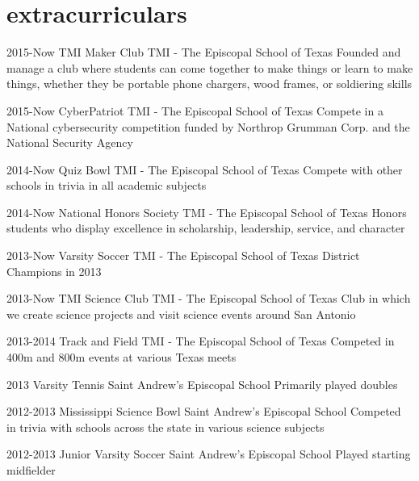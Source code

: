 \documentclass[]{friggeri-cv} %
\begin{document}
\section{extracurriculars}

\begin{entrylist}


\entry
{2015-Now}
{TMI Maker Club}
{TMI - The Episcopal School of Texas}
{Founded and manage a club where students can come together to make things or learn to make things, whether they be portable phone chargers, wood frames, or soldiering skills}



\entry
{2015-Now}
{CyberPatriot}
{TMI - The Episcopal School of Texas}
{Compete in a National cybersecurity competition funded by Northrop Grumman Corp. and the National Security Agency}


\entry
{2014-Now}
{Quiz Bowl}
{TMI - The Episcopal School of Texas}
{Compete with other schools in trivia in all academic subjects}


\entry
{2014-Now}
{National Honors Society}
{TMI - The Episcopal School of Texas}
{Honors students who display excellence in scholarship, leadership, service, and character}


\entry
{2013-Now}
{Varsity Soccer}
{TMI - The Episcopal School of Texas}
{District Champions in 2013}


\entry
{2013-Now}
{TMI Science Club}
{TMI - The Episcopal School of Texas}
{Club in which we create science projects and visit science events around San Antonio}


\entry
{2013-2014}
{Track and Field}
{TMI - The Episcopal School of Texas}
{Competed in 400m and 800m events at various Texas meets}


\entry
{2013}
{Varsity Tennis}
{Saint Andrew's Episcopal School}
{Primarily played doubles}


\entry
{2012-2013}
{Mississippi Science Bowl}
{Saint Andrew's Episcopal School}
{Competed in trivia with schools across the state in various science subjects}


\entry
{2012-2013}
{Junior Varsity Soccer}
{Saint Andrew's Episcopal School}
{Played starting midfielder}


\end{entrylist}
\end{document}
